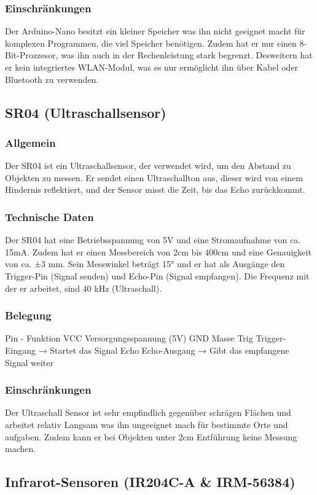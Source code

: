 \subsubsection{Einschränkungen}
Der Arduino-Nano besitzt ein kleiner Speicher was ihn  nicht geeignet macht für komplexen Programmen, die viel Speicher benötigen. 
Zudem hat er nur einen 8-Bit-Prozzesor, was ihn auch in der Rechenleistung stark begrenzt. Desweitern hat er kein integriertes WLAN-Modul, 
was es nur ermöglicht ihn  über Kabel oder Bluetooth zu verwenden.
%
\subsection{SR04 (Ultraschallsensor)}
%
\subsubsection{Allgemein}
Der SR04 ist ein Ultraschallsensor, der verwendet wird, um den Abstand zu Objekten zu messen. 
Er sendet einen Ultraschallton aus, dieser wird von einem Hindernis reflektiert, und der Sensor misst die Zeit, bis das Echo zurückkommt.
\subsubsection{Technische Daten}
Der SR04 hat eine Betriebsspannung von 5V und eine Stromaufnahme von ca. 15mA. 
Zudem hat er einen Messbereich von 2cm bis 400cm und eine Genauigkeit von ca. ±3 mm. 
Sein Messwinkel beträgt 15° und er hat als Ausgänge den Trigger-Pin (Signal senden) und Echo-Pin (Signal empfangen). 
Die Frequenz mit der er arbeitet, sind 40 kHz (Ultraschall).
\subsubsection{Belegung}
Pin  -   	Funktion
VCC	Versorgungsspannung (5V)
GND	Masse
Trig	Trigger-Eingang → Startet das Signal
Echo	Echo-Ausgang → Gibt das empfangene Signal weiter
\subsubsection{Einschränkungen}
Der Ultraschall Sensor ist sehr empfindlich gegenüber schrägen Flächen und arbeitet relativ Langsam was ihn ungeeignet mach für bestimmte Orte und aufgaben. 
Zudem kann er bei Objekten unter 2cm Entführung keine Messung machen.
%
\subsection{Infrarot-Sensoren (IR204C-A \& IRM-56384)}
%
